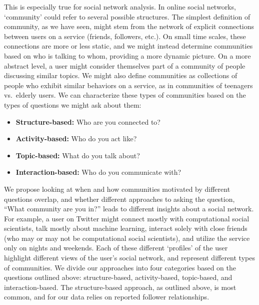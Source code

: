 This is especially true for social network analysis. In online social networks, `community' could refer to several possible structures. The simplest definition of community, as we have seen, might stem from the network of explicit connections between users on a service (friends, followers, etc.). On small time scales, these connections are more or less static, and we might instead determine communities based on who is talking to whom, providing a more dynamic picture. On a more abstract level, a user might consider themselves part of a community of people discussing similar topics. We might also define communities as collections of people who exhibit similar behaviors on a service, as in communities of teenagers vs.\ elderly users. We can characterize these types of communities based on the types of questions we might ask about them:
\begin{itemize}
	\item \textbf{Structure-based:} Who are you connected to?
	\item \textbf{Activity-based:} Who do you act like?
	\item \textbf{Topic-based:} What do you talk about?
	\item \textbf{Interaction-based:} Who do you communicate with?
\end{itemize}

We propose looking at when and how communities motivated by different questions overlap, and whether different approaches to asking the question, ``What community are you in?'' leads to different insights about a social network. For example, a user on Twitter might connect mostly with computational social scientists, talk mostly about machine learning, interact solely with close friends (who may or may not be computational social scientists), and utilize the service only on nights and weekends. Each of these different `profiles' of the user highlight different views of the user's social network, and represent different types of communities. We divide our approaches into four categories based on the questions outlined above: structure-based, activity-based, topic-based, and interaction-based. The structure-based approach, as outlined above, is most common, and for our data relies on reported follower relationships.

